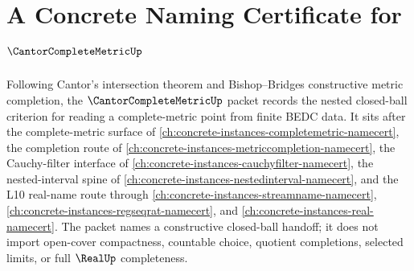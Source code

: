 \chapter{A Concrete Naming Certificate for $\CantorCompleteMetricUp$}
\label{ch:concrete-instances-cantor-complete-metric-namecert}

Following Cantor's intersection theorem and Bishop--Bridges constructive metric completion, the $\CantorCompleteMetricUp$ packet records the nested closed-ball criterion for reading a complete-metric point from finite BEDC data. It sits after the complete-metric surface of \autoref{ch:concrete-instances-completemetric-namecert}, the completion route of \autoref{ch:concrete-instances-metriccompletion-namecert}, the Cauchy-filter interface of \autoref{ch:concrete-instances-cauchyfilter-namecert}, the nested-interval spine of \autoref{ch:concrete-instances-nestedinterval-namecert}, and the L10 real-name route through \autoref{ch:concrete-instances-streamname-namecert}, \autoref{ch:concrete-instances-regseqrat-namecert}, and \autoref{ch:concrete-instances-real-namecert}. The packet names a constructive closed-ball handoff; it does not import open-cover compactness, countable choice, quotient completions, selected limits, or full $\RealUp$ completeness.

